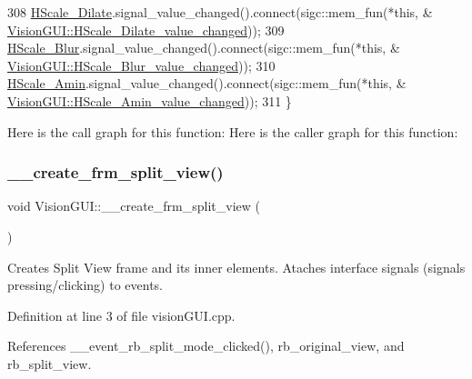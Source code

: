 \begin{DoxyCode}
308     \hyperlink{class_vision_g_u_i_a6a7c757a11a2699e841b6b49fe18d1de}{HScale\_Dilate}.signal\_value\_changed().connect(sigc::mem\_fun(*\textcolor{keyword}{this}, &
      \hyperlink{class_vision_g_u_i_a77d74bbe2fdcc16d5cf18094d257d219}{VisionGUI::HScale\_Dilate\_value\_changed}));
309     \hyperlink{class_vision_g_u_i_a88fa2852521012287ae804404280c57f}{HScale\_Blur}.signal\_value\_changed().connect(sigc::mem\_fun(*\textcolor{keyword}{this}, &
      \hyperlink{class_vision_g_u_i_a2f959701d835dd3fb53b20698754c013}{VisionGUI::HScale\_Blur\_value\_changed}));
310     \hyperlink{class_vision_g_u_i_a72d3a4fe84821ceafeb4293f196aacd7}{HScale\_Amin}.signal\_value\_changed().connect(sigc::mem\_fun(*\textcolor{keyword}{this}, &
      \hyperlink{class_vision_g_u_i_a5ac13b6caa3cef4ddc8137c432b645ba}{VisionGUI::HScale\_Amin\_value\_changed}));
311 \}
\end{DoxyCode}
Here is the call graph for this function\+:
Here is the caller graph for this function\+:
\mbox{\label{class_vision_g_u_i_aab78b384bacc2a12d385b1baef011ed4}} 
\subsubsection{\texorpdfstring{\+\_\+\+\_\+create\+\_\+frm\+\_\+split\+\_\+view()}{\_\_create\_frm\_split\_view()}}
{\footnotesize\ttfamily void Vision\+G\+U\+I\+::\+\_\+\+\_\+create\+\_\+frm\+\_\+split\+\_\+view (\begin{DoxyParamCaption}{ }\end{DoxyParamCaption})\hspace{0.3cm}{\ttfamily [private]}}



Creates Split View frame and its inner elements. Ataches interface signals (signals pressing/clicking) to events. 



Definition at line 3 of file vision\+G\+U\+I.\+cpp.



References \+\_\+\+\_\+event\+\_\+rb\+\_\+split\+\_\+mode\+\_\+clicked(), rb\+\_\+original\+\_\+view, and rb\+\_\+split\+\_\+view.



